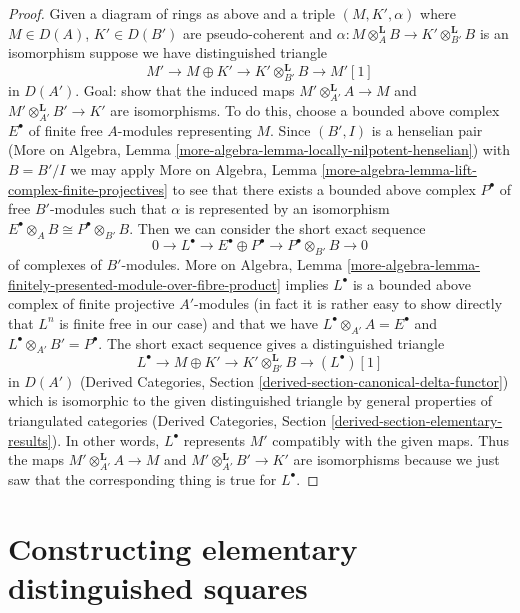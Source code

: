 \begin{proof}
\medskip\noindent
Given a diagram of rings as above and a triple
$(M, K', \alpha)$ where $M \in D(A)$, $K' \in D(B')$ are
pseudo-coherent and
$\alpha : M \otimes_A^\mathbf{L} B \to K' \otimes_{B'}^\mathbf{L} B$
is an isomorphism suppose we have distinguished triangle
$$
M' \to M \oplus K' \to K' \otimes_{B'}^\mathbf{L} B \to M'[1]
$$
in $D(A')$. Goal: show that the induced maps
$M' \otimes_{A'}^\mathbf{L} A \to M$ and
$M' \otimes_{A'}^\mathbf{L} B' \to K'$ are isomorphisms.
To do this, choose a bounded above complex
$E^\bullet$ of finite free $A$-modules representing $M$.
Since $(B', I)$ is a henselian pair
(More on Algebra, Lemma \ref{more-algebra-lemma-locally-nilpotent-henselian})
with $B = B'/I$ we may apply More on Algebra, Lemma
\ref{more-algebra-lemma-lift-complex-finite-projectives}
to see that there exists a bounded above complex $P^\bullet$
of free $B'$-modules such that $\alpha$ is represented
by an isomorphism $E^\bullet \otimes_A B \cong P^\bullet \otimes_{B'} B$.
Then we can consider the short exact sequence
$$
0 \to L^\bullet \to
E^\bullet \oplus P^\bullet \to P^\bullet \otimes_{B'} B \to 0
$$
of complexes of $B'$-modules.
More on Algebra, Lemma
\ref{more-algebra-lemma-finitely-presented-module-over-fibre-product}
implies $L^\bullet$ is a bounded above complex of
finite projective $A'$-modules
(in fact it is rather easy to show directly that $L^n$ is finite free
in our case) and that we have
$L^\bullet \otimes_{A'} A = E^\bullet$ and
$L^\bullet \otimes_{A'} B' = P^\bullet$.
The short exact sequence gives a distinguished triangle
$$
L^\bullet \to M \oplus K' \to K' \otimes_{B'}^\mathbf{L} B \to (L^\bullet)[1]
$$
in $D(A')$ (Derived Categories, Section
\ref{derived-section-canonical-delta-functor}) which is isomorphic
to the given distinguished triangle by general properties of
triangulated categories (Derived Categories, Section
\ref{derived-section-elementary-results}). In other words, $L^\bullet$
represents $M'$ compatibly with the given maps. Thus the maps
$M' \otimes_{A'}^\mathbf{L} A \to M$ and
$M' \otimes_{A'}^\mathbf{L} B' \to K'$ are
isomorphisms because we just saw that the corresponding
thing is true for $L^\bullet$.
\end{proof}







\section{Constructing elementary distinguished squares}
\label{section-elementary-dsitnguished-squares}


